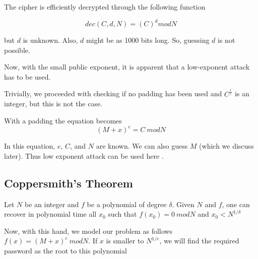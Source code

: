 \documentclass[11pt]{article}
\begin{document}
The cipher is efficiently decrypted through the following function

\[
dec(C, d, N) = (C)^{d} mod N
\]

but $d$ is unknown. Also, $d$ might be as 1000 bits long. So, guessing $d$ is not possible. \par

Now, with the small public exponent, it is apparent that a low-exponent attack has to be used. \par

Trivially, we proceeded with checking if no padding has been used and $C^{\frac{1}{e}}$ is an integer, but this is not the case. \par

With a padding the equation becomes
\[
(M+x)^{e} = C \ mod N
\]

In this equation, $e$, $C$, and $N$ are known. We can also guess $M$ (which we discuss later). Thus low exponent attack can be used here \cite{latticereduction}. \par


\subsection*{Coppersmith's Theorem} Let $N$ be an integer and $f$ be a polynomial of degree $δ$. Given $N$ and $f$, one can recover in polynomial time all $x_0$ such that $f(x_0) = 0\  mod N$ and $x_0 < N^{1/\delta}$ \cite{RSA_slides} \par

Now, with this hand, we model our problem as follows $f(x) = (M+x)^{e}\ mod N$. If $x$ is smaller to $N^{1/e}$, we will find the required password as the root to this polynomial \par
\end{document}
